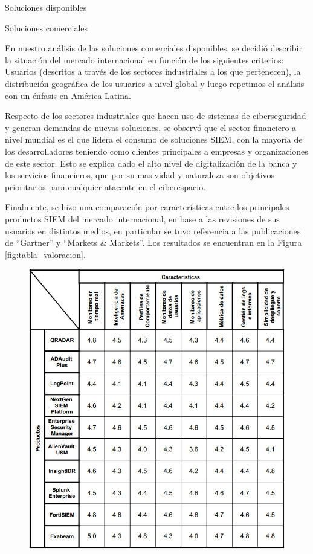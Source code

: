 \begin{section}{Soluciones disponibles}
    \begin{subsection}{Soluciones comerciales}
    
        En nuestro análisis de las soluciones comerciales disponibles, se decidió describir la situación del mercado internacional en función de los siguientes criterios: 
        Usuarios (descritos a través de los sectores industriales a los que pertenecen), la distribución geográfica de los usuarios a nivel global y luego repetimos el análisis con un énfasis en América Latina. \par 
        Respecto de los sectores industriales que hacen uso de sistemas de ciberseguridad y generan demandas de nuevas soluciones, se observó que el sector financiero a nivel mundial es el que lidera el consumo de soluciones SIEM, con la mayoría de los desarrolladores teniendo como clientes principales a empresas y organizaciones de este sector. Esto se explica dado el alto nivel de digitalización de la banca y los servicios financieros, que por su masividad y naturaleza son objetivos prioritarios para cualquier atacante en el ciberespacio. \par
        Finalmente, se hizo una comparación por características entre los principales productos SIEM del mercado internacional, en base a las revisiones de sus usuarios en distintos medios, en particular se tuvo referencia a las publicaciones de “Gartner”\cite{ranking} y “Markets \& Markets”\cite{markets_markets}. 
        Los resultados se encuentran en la Figura \ref{fig:tabla_valoracion}.\par
        \protect
         \begin{figure}
            \centering
            \includegraphics[width=1\textwidth]{./marco_teorico_imagenes/tabla_3_valoracion.png}

\end{figure}
\end{subsection}
\end{section}
